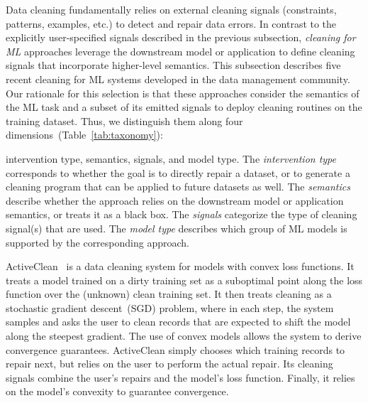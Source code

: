 \documentclass[11pt,dvipsnames]{article}
\begin{document}
Data cleaning fundamentally relies on external cleaning signals (constraints, patterns, examples, etc.) to detect and repair data errors.   In contrast to the explicitly user-specified signals described in the previous subsection, {\it cleaning for ML} approaches leverage the downstream model or application to define cleaning signals that incorporate higher-level semantics.  This subsection describes five recent cleaning for ML systems developed in the data management community. Our rationale for this selection is that these approaches consider the semantics of the ML task and a subset of its emitted signals to deploy cleaning routines on the training dataset.
Thus, we distinguish them along four dimensions~(Table~\ref{tab:taxonomy}):

intervention type, semantics, signals, and model type.
The \emph{intervention type} corresponds to whether the goal is to directly repair a dataset, or to generate a cleaning program that can be applied to future datasets as well.
The \emph{semantics} describe whether the approach relies on the downstream model or application semantics, or treats it as a black box.
The \emph{signals} categorize the type of cleaning signal(s) that are used.
The \emph{model type} describes which group of ML models is supported by the corresponding approach.

ActiveClean~\cite{ActiveClean} is a data cleaning system for models with convex loss functions.  It treats a model trained on a dirty training set as a suboptimal point along the loss function over the (unknown) clean training set.  It then treats cleaning as a stochastic gradient descent~(SGD) problem, where in each step, the system samples and asks the user to clean records that are expected to shift the model along the steepest gradient.  The use of convex models allows the system to derive convergence guarantees.  
%
ActiveClean simply chooses which training records to repair next, but relies on the user to perform the actual repair.  Its cleaning signals combine the user's repairs and the model's loss function.  Finally, it relies on the model's convexity to guarantee convergence.   
\end{document}
